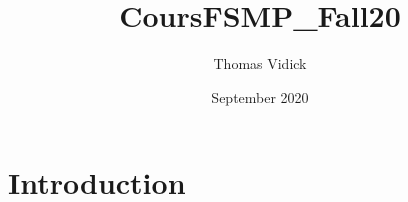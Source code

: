 \documentclass{article}
\title{CoursFSMP_Fall20}
\author{Thomas Vidick}
\date{September 2020}
\begin{document}
\maketitle

\section{Introduction}
\end{document}
